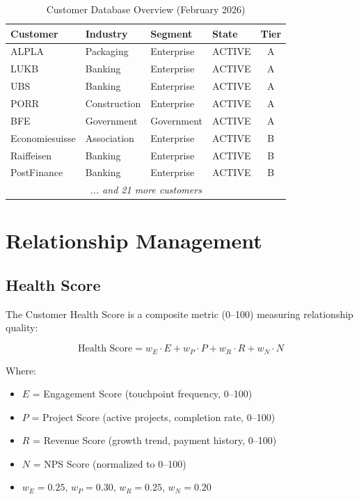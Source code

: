 \begin{table}[htbp]
\centering
\caption{Customer Database Overview (February 2026)}
\label{tab:bp-customers}
\renewcommand{\arraystretch}{1.2}
\small
\begin{tabular}{@{}llllc@{}}
\toprule
\textbf{Customer} & \textbf{Industry} & \textbf{Segment} & \textbf{State} & \textbf{Tier} \\
\midrule
ALPLA & Packaging & Enterprise & ACTIVE & A \\
LUKB & Banking & Enterprise & ACTIVE & A \\
UBS & Banking & Enterprise & ACTIVE & A \\
PORR & Construction & Enterprise & ACTIVE & A \\
BFE & Government & Government & ACTIVE & A \\
Economiesuisse & Association & Enterprise & ACTIVE & B \\
Raiffeisen & Banking & Enterprise & ACTIVE & B \\
PostFinance & Banking & Enterprise & ACTIVE & B \\
\multicolumn{5}{c}{\textit{... and 21 more customers}} \\
\bottomrule
\end{tabular}
\end{table}


\section{Relationship Management}
\label{sec:bp-relationship}

\subsection{Health Score}

The Customer Health Score is a composite metric (0--100) measuring relationship quality:

\begin{equation}
\text{Health Score} = w_E \cdot E + w_P \cdot P + w_R \cdot R + w_N \cdot N
\end{equation}

Where:
\begin{itemize}[nosep]
\item $E$ = Engagement Score (touchpoint frequency, 0--100)
\item $P$ = Project Score (active projects, completion rate, 0--100)
\item $R$ = Revenue Score (growth trend, payment history, 0--100)
\item $N$ = NPS Score (normalized to 0--100)
\item $w_E = 0.25$, $w_P = 0.30$, $w_R = 0.25$, $w_N = 0.20$
\end{itemize}

